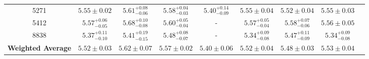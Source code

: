 \documentclass[fleqn,usenatbib]{mnras}
\begin{document}
\begin{table*}
\begin{tabular}{ccccccccc}
5271 & $5.55 \pm 0.02$ &$5.61^{+0.08} _{-0.06}$& $5.58^{+0.04} _{-0.03}$ & $5.40^{+0.14} _{-0.09}$ & $5.55 \pm 0.04$ & $5.52 \pm 0.04$ & $5.55 \pm 0.03$ \\

5412 & $5.57^{+0.06} _{-0.05}$ & $5.68^{+0.10} _{-0.08}$ & $5.60^{+0.05} _{-0.04}$ &  - & $5.57^{+0.05} _{-0.04}$ & $5.58^{+0.07} _{-0.06}$ & $5.56 \pm 0.05$ \\

8838 & $5.37^{+0.11} _{-0.10}$ & $5.41^{+0.19} _{-0.15}$ & $5.48^{+0.08} _{-0.07}$ &-& $5.34^{+0.09} _{-0.08}$ & $5.47^{+0.11} _{-0.09}$ & $5.34^{+0.09} _{-0.08}$ \\

\textbf{Weighted Average} &\boldmath$5.52 \pm 0.03$& \boldmath$5.62 \pm 0.07 $&\boldmath$5.57 \pm 0.02$&\boldmath$5.40 \pm 0.06$&\boldmath$5.52 \pm 0.04$&\boldmath$5.48 \pm 0.03$&\boldmath$5.53 \pm 0.04$\\

\hline
\end{tabular}
\end{table*}
\end{document}
